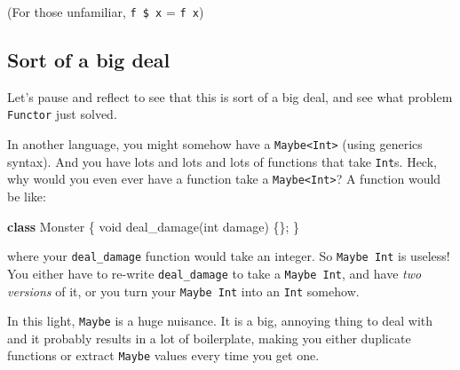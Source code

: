 \documentclass[]{article}
\newenvironment{Shaded}{}{}
\newcommand{\DataTypeTok}[1]{\textcolor[rgb]{0.56,0.13,0.00}{#1}}
\newcommand{\DecValTok}[1]{\textcolor[rgb]{0.25,0.63,0.44}{#1}}
\newcommand{\FunctionTok}[1]{\textcolor[rgb]{0.02,0.16,0.49}{#1}}
\newcommand{\KeywordTok}[1]{\textcolor[rgb]{0.00,0.44,0.13}{\textbf{#1}}}
\newcommand{\NormalTok}[1]{#1}
\newcommand{\OperatorTok}[1]{\textcolor[rgb]{0.40,0.40,0.40}{#1}}
\begin{document}
\begin{Shaded}
\end{Shaded}

(For those unfamiliar, \texttt{f\ \$\ x} = \texttt{f\ x})

\subsection{Sort of a big deal}\label{sort-of-a-big-deal}

Let's pause and reflect to see that this is sort of a big deal, and see what
problem \texttt{Functor} just solved.

In another language, you might somehow have a
\texttt{Maybe\textless{}Int\textgreater{}} (using generics syntax). And you have
lots and lots and lots of functions that take \texttt{Int}s. Heck, why would you
even ever have a function take a \texttt{Maybe\textless{}Int\textgreater{}}? A
function would be like:

\begin{Shaded}
\begin{Highlighting}[]
\KeywordTok{class}\NormalTok{ Monster }\OperatorTok{\{}
    \DataTypeTok{void} \FunctionTok{deal\_damage}\OperatorTok{(}\DataTypeTok{int}\NormalTok{ damage}\OperatorTok{)} \OperatorTok{\{\};}
\OperatorTok{\}}
\end{Highlighting}
\end{Shaded}

where your \texttt{deal\_damage} function would take an integer. So
\texttt{Maybe\ Int} is useless! You either have to re-write
\texttt{deal\_damage} to take a \texttt{Maybe\ Int}, and have \emph{two
versions} of it, or you turn your \texttt{Maybe\ Int} into an \texttt{Int}
somehow.

In this light, \texttt{Maybe} is a huge nuisance. It is a big, annoying thing to
deal with and it probably results in a lot of boilerplate, making you either
duplicate functions or extract \texttt{Maybe} values every time you get one.
\end{document}
